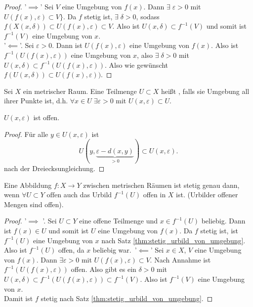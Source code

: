 \begin{proof}
'$\implies$' Sei $V$ eine Umgebung von  $f(x)$. Dann  $\exists \; ε>0$ mit $U(f(x),ε) \subset V\}$. Da $f$ stetig ist,  $\exists \; δ>0$, sodass $f(X(x,δ)) \subset U(f(x),ε)\subset V$. Also ist $U(x,δ)\subset f^{-1}(V)$ und somit ist $f^{-1}(V)$ eine Umgebung von $x$. \\
'$\impliedby$'.  Sei $ε>0$. Dann ist  $U(f(x),ε)$ eine Umgebung von  $f(x)$. Also ist  $f^{-1}(U(f(x),ε))$ eine Umgebung von $x$, also  $\exists \; δ>0$ mit $U(x,δ) \subset f^{-1}(U(f(x),ε))$. Also wie gewünscht $f(U(x,δ)) \subset U(f(x),ε))$.
\end{proof}

\begin{definition}
    Sei $X$ ein metrischer Raum. Eine Teilmenge  $U\subset X$ heißt , falls sie Umgebung all ihrer Punkte ist, d.h. $\forall x\in U \;\exists ε>0$ mit $U(x,ε)\subset U$.
\end{definition}
\begin{remark}
    $U(x,ε)$ ist offen.
\end{remark}
\begin{proof}
    Für alle $y\in U(x,ε)$ ist
    \[
        U(y, \underbrace{ε - d(x,y)}_{>0}) \subset U(x,ε)
    .\] 
    nach der Dreiecksungleichung.
\end{proof}

\begin{theorem}
    Eine Abbildung $f:X\to Y$ zwischen metrischen Räumen ist stetig genau dann, wenn $\forall U \subset Y \text{  offen}$ auch das Urbild $f^{-1}(U)$ offen in $X$ ist. (Urbilder offener Mengen sind offen).
\end{theorem}
\begin{proof}
    '$\implies$ '. Sei $U\subset Y$ eine offene Teilmenge und $x\in f^{-1}(U)$ beliebig. Dann ist $f(x) \in U$ und somit ist $U$ eine Umgebung von  $f(x)$. Da  $f$ stetig ist, ist  $f^{-1}(U)$ eine Umgebung von $x$ nach Satz \ref{thm:stetig_urbild_von_umgebung}. Also ist $f^{-1}(U)$ offen, da $x$ beliebig war.\
    '$\impliedby$' Sei $x\in X$, $V$ eine Umgebung von  $f(x)$. Dann  $\exists ε>0$ mit $U(f(x),ε)\subset V$. Nach Annahme ist $f^{-1}(U(f(x),ε))$ offen. Also gibt es ein $δ>0$ mit  $U(x,δ) \subset f^{-1}(U(f(x),ε))\subset f^{-1}(V)$. Also ist $f^{-1}(V)$ eine Umgebung von $x$. \\
    Damit ist  $f$ stetig nach Satz \ref{thm:stetig_urbild_von_umgebung}.
\end{proof}

